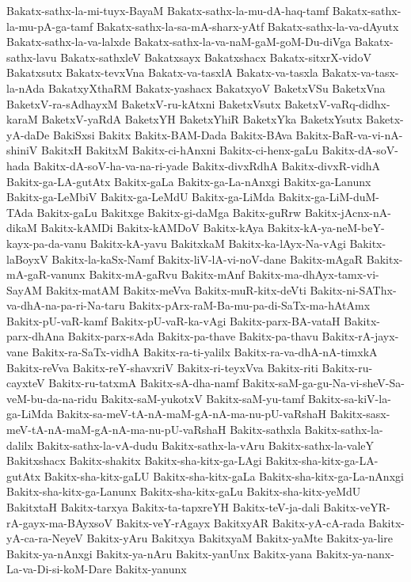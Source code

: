 {Bakatx-sathx-la-mi-tuyx-BayaM
Bakatx-sathx-la-mu-dA-haq-tamf
Bakatx-sathx-la-mu-pA-ga-tamf
Bakatx-sathx-la-sa-mA-sharx-yAtf
Bakatx-sathx-la-va-dAyutx
Bakatx-sathx-la-va-lalxde
Bakatx-sathx-la-va-naM-gaM-goM-Du-diVga
Bakatx-sathx-lavu
Bakatx-sathxleV
Bakatxsayx
Bakatxshacx
Bakatx-sitxrX-vidoV
Bakatxsutx
Bakatx-tevxVna
Bakatx-va-tasxlA
Bakatx-va-tasxla
Bakatx-va-tasx-la-nAda
BakatxyXthaRM
Bakatx-yashacx
BakatxyoV
BaketxVSu
BaketxVna
BaketxV-ra-sAdhayxM
BaketxV-ru-kAtxni
BaketxVsutx
BaketxV-vaRq-didhx-karaM
BaketxV-yaRdA
BaketxYH
BaketxYhiR
BaketxYka
BaketxYsutx
Baketx-yA-daDe
BakiSxsi
Bakitx
Bakitx-BAM-Dada
Bakitx-BAva
Bakitx-BaR-va-vi-nA-shiniV
BakitxH
BakitxM
Bakitx-ci-hAnxni
Bakitx-ci-henx-gaLu
Bakitx-dA-soV-hada
Bakitx-dA-soV-ha-va-na-ri-yade
Bakitx-divxRdhA
Bakitx-divxR-vidhA
Bakitx-ga-LA-gutAtx
Bakitx-gaLa
Bakitx-ga-La-nAnxgi
Bakitx-ga-Lanunx
Bakitx-ga-LeMbiV
Bakitx-ga-LeMdU
Bakitx-ga-LiMda
Bakitx-ga-LiM-duM-TAda
Bakitx-gaLu
Bakitxge
Bakitx-gi-daMga
Bakitx-guRrw
Bakitx-jAcnx-nA-dikaM
Bakitx-kAMDi
Bakitx-kAMDoV
Bakitx-kAya
Bakitx-kA-ya-neM-beY-kayx-pa-da-vanu
Bakitx-kA-yavu
BakitxkaM
Bakitx-ka-lAyx-Na-vAgi
Bakitx-laBoyxV
Bakitx-la-kaSx-Namf
Bakitx-liV-lA-vi-noV-dane
Bakitx-mAgaR
Bakitx-mA-gaR-vanunx
Bakitx-mA-gaRvu
Bakitx-mAnf
Bakitx-ma-dhAyx-tamx-vi-SayAM
Bakitx-matAM
Bakitx-meVva
Bakitx-muR-kitx-deVti
Bakitx-ni-SAThx-va-dhA-na-pa-ri-Na-taru
Bakitx-pArx-raM-Ba-mu-pa-di-SaTx-ma-hAtAmx
Bakitx-pU-vaR-kamf
Bakitx-pU-vaR-ka-vAgi
Bakitx-parx-BA-vataH
Bakitx-parx-dhAna
Bakitx-parx-sAda
Bakitx-pa-thave
Bakitx-pa-thavu
Bakitx-rA-jayx-vane
Bakitx-ra-SaTx-vidhA
Bakitx-ra-ti-yalilx
Bakitx-ra-va-dhA-nA-timxkA
Bakitx-reVva
Bakitx-reY-shavxriV
Bakitx-ri-teyxVva
Bakitx-riti
Bakitx-ru-cayxteV
Bakitx-ru-tatxmA
Bakitx-sA-dha-namf
Bakitx-saM-ga-gu-Na-vi-sheV-Sa-veM-bu-da-na-ridu
Bakitx-saM-yukotxV
Bakitx-saM-yu-tamf
Bakitx-sa-kiV-la-ga-LiMda
Bakitx-sa-meV-tA-nA-maM-gA-nA-ma-nu-pU-vaRshaH
Bakitx-sasx-meV-tA-nA-maM-gA-nA-ma-nu-pU-vaRshaH
Bakitx-sathxla
Bakitx-sathx-la-dalilx
Bakitx-sathx-la-vA-dudu
Bakitx-sathx-la-vAru
Bakitx-sathx-la-valeY
Bakitxshacx
Bakitx-shakitx
Bakitx-sha-kitx-ga-LAgi
Bakitx-sha-kitx-ga-LA-gutAtx
Bakitx-sha-kitx-gaLU
Bakitx-sha-kitx-gaLa
Bakitx-sha-kitx-ga-La-nAnxgi
Bakitx-sha-kitx-ga-Lanunx
Bakitx-sha-kitx-gaLu
Bakitx-sha-kitx-yeMdU
BakitxtaH
Bakitx-tarxya
Bakitx-ta-tapxreYH
Bakitx-teV-ja-dali
Bakitx-veYR-rA-gayx-ma-BAyxsoV
Bakitx-veY-rAgayx
BakitxyAR
Bakitx-yA-cA-rada
Bakitx-yA-ca-ra-NeyeV
Bakitx-yAru
Bakitxya
BakitxyaM
Bakitx-yaMte
Bakitx-ya-lire
Bakitx-ya-nAnxgi
Bakitx-ya-nAru
Bakitx-yanUnx
Bakitx-yana
Bakitx-ya-nanx-La-va-Di-si-koM-Dare
Bakitx-yanunx
}
